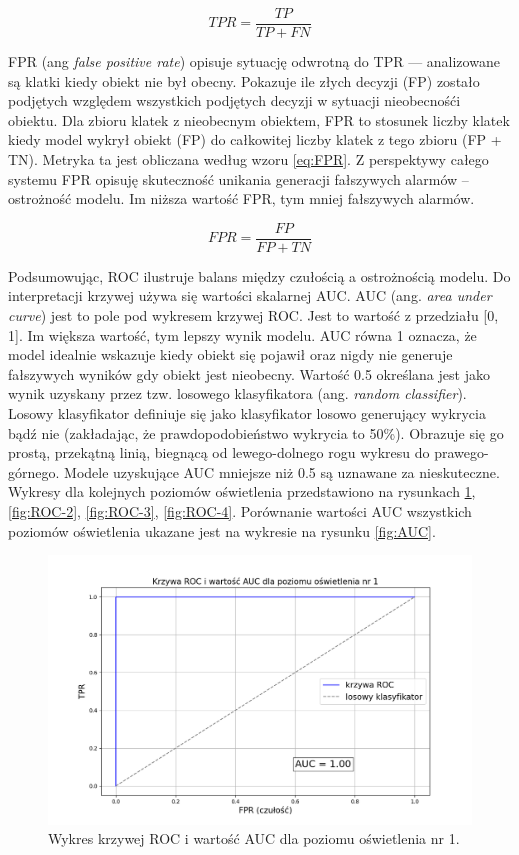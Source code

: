 \begin{equation}
    TPR = \frac{TP}{TP + FN}
    \label{eq:TPR}
\end{equation}

FPR (ang \emph{false positive rate}) opisuje sytuację odwrotną do TPR --- analizowane są klatki kiedy obiekt nie był obecny. Pokazuje ile złych decyzji (FP) zostało podjętych względem wszystkich podjętych decyzji w sytuacji nieobecnośći obiektu. Dla zbioru klatek z nieobecnym obiektem, FPR to stosunek liczby klatek kiedy model wykrył obiekt (FP) do całkowitej liczby klatek z tego zbioru (FP + TN). Metryka ta jest obliczana według wzoru \ref{eq:FPR}. Z perspektywy całego systemu FPR opisuję skuteczność unikania generacji fałszywych alarmów -- ostrożność modelu. Im niższa wartość FPR, tym mniej fałszywych alarmów.


\begin{equation}
    FPR = \frac{FP}{FP + TN}
    \label{eq:FPR}
\end{equation}

Podsumowując, ROC ilustruje balans między czułością a ostrożnością modelu. Do interpretacji krzywej używa się wartości skalarnej AUC. AUC (ang. \emph{area under curve}) jest to pole pod wykresem krzywej ROC. Jest to wartość z przedziału [0, 1]. Im większa wartość, tym lepszy wynik modelu. AUC równa 1 oznacza, że model idealnie wskazuje kiedy obiekt się pojawił oraz nigdy nie generuje fałszywych wyników gdy obiekt jest nieobecny. Wartość 0.5 określana jest jako wynik uzyskany przez tzw. losowego klasyfikatora (ang. \emph{random classifier}). Losowy klasyfikator definiuje się jako klasyfikator losowo generujący wykrycia bądź nie (zakładając, że prawdopodobieństwo wykrycia to 50\%). Obrazuje się go prostą, przekątną linią, biegnącą od lewego-dolnego rogu wykresu do prawego-górnego. Modele uzyskujące AUC mniejsze niż 0.5 są uznawane za nieskuteczne. 
Wykresy dla kolejnych poziomów oświetlenia przedstawiono na rysunkach \ref{fig:ROC-1}, \ref{fig:ROC-2}, \ref{fig:ROC-3}, \ref{fig:ROC-4}. Porównanie wartości AUC wszystkich poziomów oświetlenia ukazane jest na wykresie na rysunku \ref{fig:AUC}.



\begin{figure}[H]
    \centering
    \includegraphics[width=\linewidth]{r_test_dokładności/AUC_charts/1.png}
    \caption{Wykres krzywej ROC i wartość AUC dla poziomu oświetlenia nr 1.}
    \label{fig:ROC-1}
\end{figure}

